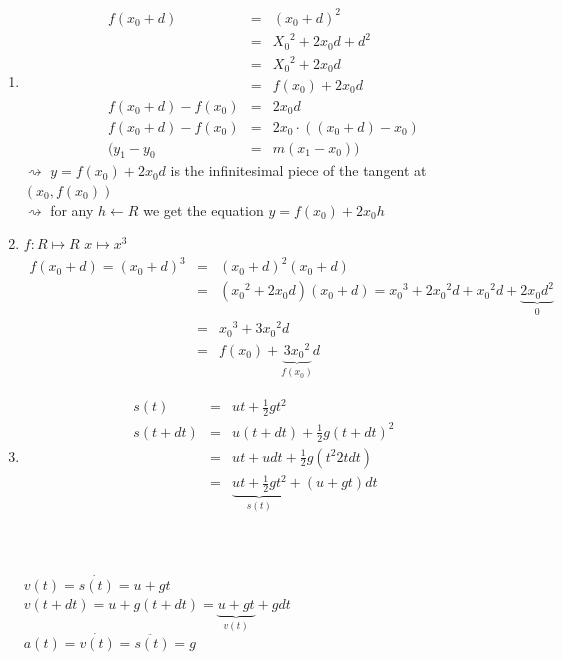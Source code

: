 \documentclass[a4paper, 12pt]{article}
\begin{document}
\begin{enumerate}
\item \begin{eqnarray*}
f(x_0+d) & =& (x_0+d)^2 \\
&=& {X_0}^2 + 2{x_0}d + d^2 \\
&=& {X_0}^2 + 2{x_0}d \\
&=& f(x_0) + 2{x_0}d \\
f(x_0+d) - f(x_0) &=&   2{x_0}d \\
f(x_0+d) - f(x_0) &=&  2{x_0}\cdot((x_0+d)-x_0) \\
(y_1 - y_0  &=& m(x_1 - x_0)) 
\end{eqnarray*}
$\rightsquigarrow$ $y = f(x_0) + 2{x_0}d $ is the infinitesimal piece of the tangent at $ (x_0,f(x_0)) $\\
$\rightsquigarrow$ for any $ h \leftarrow R $ we get the equation 
$y = f(x_0) + 2{x_0}h$
\begin{center}
\end{center}

\item 
$f:R\mapsto R$ $x\mapsto x^3$\\
\begin{eqnarray*}
f(x_0+d) = (x_0+d)^3 &=& (x_0+d)^2(x_0+d)\\
& = & ({x_0}^2+2{x_0}d)(x_0+d) = {x_0}^3 + 2{x_0}^2 d + {x_0}^2 d + \underbrace{2{x_0}d^2}_{0}\\
& = &{x_0}^3 + 3{x_0}^2 d \\
& = & f(x_0) + \underbrace{3{x_0}^2}_{f(x_0)}d
\end{eqnarray*}
\item
\begin{eqnarray*}
s(t) &=& ut + \frac{1}{2}gt^2\\
s(t+dt) &=& u(t+dt) + \frac{1}{2}g(t+dt)^2\\
& = & ut + udt +  \frac{1}{2}g(t^2 2tdt)\\
& = & \underbrace{ut + \frac{1}{2}gt^2}_{s(t)} + (u+gt)dt\\
\end{eqnarray*}
\\
\\
\begin{centering}
$v(t) = \dot{s(t)}= u + gt$\\
$v(t + dt) = u + g(t+dt) = \underbrace{u + gt}_{v(t)} + gdt$\\
$a(t) = \dot{v(t)} = \ddot{s(t)} = g$\\
\end{centering}
\end{enumerate}
\end{document}
